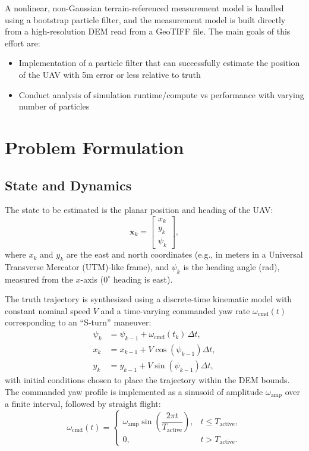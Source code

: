 \documentclass[conference]{IEEEtran}
\begin{document}
A nonlinear, non-Gaussian terrain-referenced measurement model is handled using a bootstrap particle filter, and the measurement model is built directly from a high-resolution DEM read from a GeoTIFF file.\cite{USGS_GrandCanyonNP_2019} The main goals of this effort are:
\begin{itemize}
  \item Implementation of a particle filter that can successfully estimate the position of the UAV with 5m error or less relative to truth
  \item Conduct analysis of simulation runtime/compute vs performance with varying number of particles
\end{itemize}

\section{Problem Formulation}
\subsection{State and Dynamics}
The state to be estimated is the planar position and heading of the UAV:
\begin{equation}
  \bm{x}_k = 
  \begin{bmatrix}
    x_k \\ y_k \\ \psi_k
  \end{bmatrix},
\end{equation}
where $x_k$ and $y_k$ are the east and north coordinates (e.g., in meters in a Universal Transverse Mercator (UTM)-like frame), and $\psi_k$ is the heading angle (rad), measured from the $x$-axis ($0^\circ$ heading is east).

The truth trajectory is synthesized using a discrete-time kinematic model with constant nominal speed $V$ and a time-varying commanded yaw rate $\omega_{\text{cmd}}(t)$ corresponding to an ``S-turn'' maneuver:
\begin{align}
  \psi_k &= \psi_{k-1} + \omega_{\text{cmd}}(t_k)\,\Delta t, \\
  x_k &= x_{k-1} + V \cos(\psi_{k-1}) \Delta t, \\
  y_k &= y_{k-1} + V \sin(\psi_{k-1}) \Delta t,
\end{align}
with initial conditions chosen to place the trajectory within the DEM bounds. The commanded yaw profile is implemented as a sinusoid of amplitude $\omega_{\text{amp}}$ over a finite interval, followed by straight flight:
\begin{equation}
\omega_{\text{cmd}}(t) =
\begin{cases}
  \omega_{\text{amp}} \sin\left( \dfrac{2\pi t}{T_{\text{active}}} \right), & t \le T_{\text{active}},\\[4pt]
  0, & t > T_{\text{active}}.
\end{cases}
\end{equation}
\end{document}
